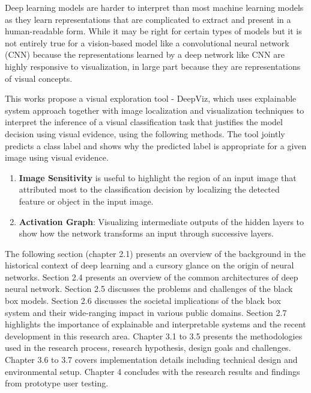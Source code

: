 Deep learning models are harder to interpret than most machine learning models as they learn representations that are complicated to extract and present in a human-readable form.  While it may be right for certain types of models but it is not entirely true for a vision-based model like a convolutional neural network (CNN) because the representations learned by a deep network like CNN are highly responsive to visualization, in large part because they are representations of visual concepts. 

This works propose a visual exploration tool - DeepViz, which uses explainable system approach together with image localization and visualization techniques to interpret the inference of a visual classification task that justifies the model decision using visual evidence, using the following methods. The tool jointly predicts a class label and shows why the predicted label is appropriate for a given image using visual evidence.

\begin{enumerate}
\item \textbf{Image Sensitivity} is useful to highlight the region of an input image that attributed most to the classification decision by localizing the detected feature or object in the input image.


\item  \textbf{Activation Graph}: Visualizing intermediate outputs of the hidden layers to show how the network transforms an input through successive layers.

\end{enumerate}

The following section (chapter 2.1) presents an overview of the background in the historical context of deep learning and a cursory glance on the origin of neural networks. Section 2.4 presents an overview of the common architectures of deep neural network. Section 2.5 discusses the problems and challenges of the black box models. Section 2.6 discusses the societal implications of the black box system and their wide-ranging impact in various public domains. Section 2.7 highlights the importance of explainable and interpretable systems and the recent development in this research area. Chapter 3.1 to 3.5 presents the methodologies used in the research process, research hypothesis, design goals and challenges. Chapter 3.6 to 3.7 covers implementation details including technical design and environmental setup. Chapter 4 concludes with the research results and findings from prototype user testing.


\iffalse %
\fi %